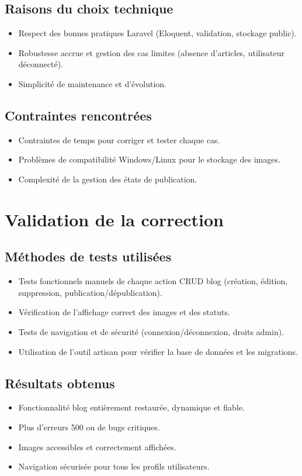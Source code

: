 \documentclass[a4paper,12pt]{report}
\begin{document}
\subsection{Raisons du choix technique}
\begin{itemize}
    \item Respect des bonnes pratiques Laravel (Eloquent, validation, stockage public).
    \item Robustesse accrue et gestion des cas limites (absence d’articles, utilisateur déconnecté).
    \item Simplicité de maintenance et d’évolution.
\end{itemize}

\subsection{Contraintes rencontrées}
\begin{itemize}
    \item Contraintes de temps pour corriger et tester chaque cas.
    \item Problèmes de compatibilité Windows/Linux pour le stockage des images.
    \item Complexité de la gestion des états de publication.
\end{itemize}

\section{Validation de la correction}
\subsection{Méthodes de tests utilisées}
\begin{itemize}
    \item Tests fonctionnels manuels de chaque action CRUD blog (création, édition, suppression, publication/dépublication).
    \item Vérification de l’affichage correct des images et des statuts.
    \item Tests de navigation et de sécurité (connexion/déconnexion, droits admin).
    \item Utilisation de l’outil artisan pour vérifier la base de données et les migrations.
\end{itemize}
\subsection{Résultats obtenus}
\begin{itemize}
    \item Fonctionnalité blog entièrement restaurée, dynamique et fiable.
    \item Plus d’erreurs 500 ou de bugs critiques.
    \item Images accessibles et correctement affichées.
    \item Navigation sécurisée pour tous les profils utilisateurs.
\end{itemize}
\end{document}
